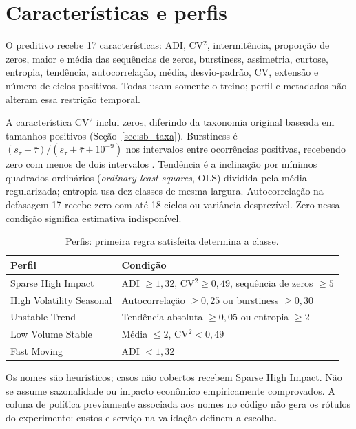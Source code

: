 \section{Características e perfis}
\label{sec:carac_series}
O preditivo recebe 17 características: ADI, CV$^2$, intermitência, proporção de zeros, maior e média das sequências de zeros, burstiness, assimetria, curtose, entropia, tendência, autocorrelação, média, desvio-padrão, CV, extensão e número de ciclos positivos. Todas usam somente o treino; perfil e metadados não alteram essa restrição temporal.

A característica CV$^2$ inclui zeros, diferindo da taxonomia original baseada em tamanhos positivos (Seção~\ref{sec:sb_taxa}). Burstiness é $(s_\tau-\bar\tau)/(s_\tau+\bar\tau+10^{-9})$ nos intervalos entre ocorrências positivas, recebendo zero com menos de dois intervalos \citep{GohBarabasi2008Burstiness}. Tendência é a inclinação por mínimos quadrados ordinários (\textit{ordinary least squares}, OLS) dividida pela média regularizada; entropia usa dez classes de mesma largura. Autocorrelação na defasagem 17 recebe zero com até 18 ciclos ou variância desprezível. Zero nessa condição significa estimativa indisponível.

\begin{table}[htbp]\centering\small
\caption{Perfis: primeira regra satisfeita determina a classe.}\label{tab:pod}
\begin{tabular}{@{}p{4.2cm}p{8.2cm}@{}}\toprule
Perfil & Condição\\\midrule
Sparse High Impact & ADI $\geq1{,}32$, CV$^2\geq0{,}49$, sequência de zeros $\geq5$\\
High Volatility Seasonal & Autocorrelação $\geq0{,}25$ ou burstiness $\geq0{,}30$\\
Unstable Trend & Tendência absoluta $\geq0{,}05$ ou entropia $\geq2$\\
Low Volume Stable & Média $\leq2$, CV$^2<0{,}49$\\
Fast Moving & ADI $<1{,}32$\\\bottomrule
\end{tabular}\end{table}

Os nomes são heurísticos; casos não cobertos recebem Sparse High Impact. Não se assume sazonalidade ou impacto econômico empiricamente comprovados. A coluna de política previamente associada aos nomes no código não gera os rótulos do experimento: custos e serviço na validação definem a escolha.

